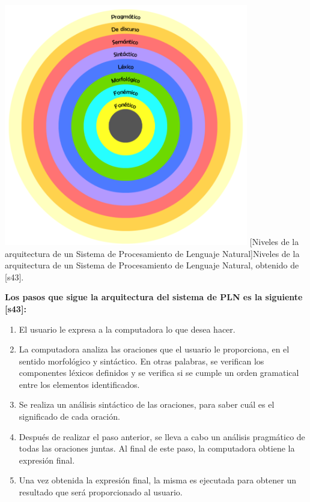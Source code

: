 \begin{center}
    \includegraphics[width=0.8\textwidth]{Images/Cap 2/Niveles_Arquitectura_PLN.png}
    [Niveles de la arquitectura de un Sistema de Procesamiento de Lenguaje Natural]{Niveles de la arquitectura de un Sistema de Procesamiento de Lenguaje Natural, obtenido de [s43].}  %
\end{center}

\textbf{Los pasos que sigue la arquitectura del sistema de PLN es la siguiente [s43]:}
\begin{enumerate}
    \item El usuario le expresa a la computadora lo que desea hacer.\\
    \item La computadora analiza las oraciones que el usuario le proporciona, en el sentido morfológico y sintáctico. En otras palabras, se verifican los componentes léxicos definidos y se verifica si se cumple un orden gramatical entre los elementos identificados.\\
    \item Se realiza un análisis sintáctico de las oraciones, para saber cuál es el significado de cada oración.\\
    \item Después de realizar el paso anterior, se lleva a cabo un análisis pragmático de todas las oraciones juntas. Al final de este paso, la computadora obtiene la expresión final.\\
    \item Una vez obtenida la expresión final, la misma es ejecutada para obtener un resultado que será proporcionado al usuario.
\end{enumerate}

